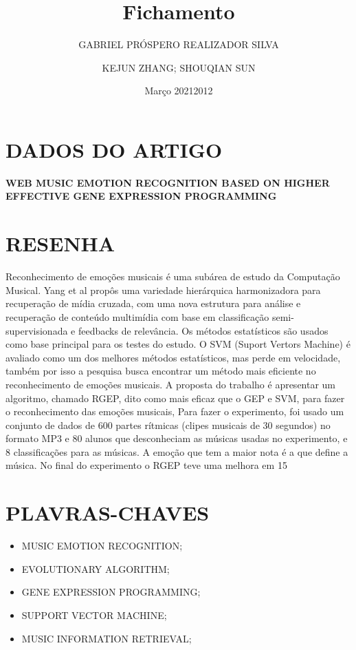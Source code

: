 \documentclass{article}
\title{Fichamento}
\author{GABRIEL PRÓSPERO REALIZADOR  SILVA}
\date{Março 2021}
\begin{document}
\maketitle

\section{DADOS DO ARTIGO}
\textbf{WEB MUSIC EMOTION RECOGNITION BASED ON HIGHER EFFECTIVE GENE EXPRESSION PROGRAMMING \\}
\author{KEJUN ZHANG; SHOUQIAN SUN \\}
\date{2012}

\section{RESENHA}
Reconhecimento de emoções musicais é uma subárea de estudo da Computação Musical. Yang et al propôs uma variedade hierárquica harmonizadora para recuperação de mídia cruzada, com uma nova estrutura para análise e recuperação de conteúdo multimídia com base em classificação semi-supervisionada e feedbacks de relevância. Os métodos estatísticos são usados como base principal para os testes do estudo. O SVM (Suport Vertors Machine) é avaliado como um dos melhores métodos estatísticos, mas perde em velocidade, também por isso a pesquisa busca encontrar um método mais eficiente no reconhecimento de emoções musicais. A proposta do trabalho é apresentar um algoritmo, chamado RGEP, dito como mais eficaz que o GEP e SVM, para fazer o reconhecimento das emoções musicais, Para fazer o experimento, foi usado um conjunto de dados de 600 partes rítmicas (clipes musicais de 30 segundos) no formato MP3 e 80 alunos que desconheciam as músicas usadas no experimento, e 8 classificações para as músicas. A emoção que tem a maior nota é a que define a música. No final do experimento o RGEP teve uma melhora em 15%

\section{PLAVRAS-CHAVES}
\begin{itemize}
    \item MUSIC EMOTION RECOGNITION; 
    \item EVOLUTIONARY ALGORITHM; 
    \item GENE EXPRESSION PROGRAMMING; 
    \item SUPPORT VECTOR MACHINE; 
    \item MUSIC INFORMATION RETRIEVAL;
\end{itemize}
\end{document}
